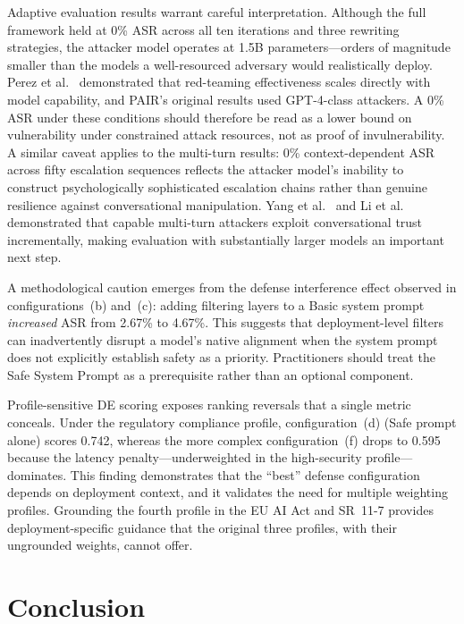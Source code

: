 Adaptive evaluation results warrant careful interpretation. Although the full framework held at 0\% ASR across all ten iterations and three rewriting strategies, the attacker model operates at 1.5B parameters---orders of magnitude smaller than the models a well-resourced adversary would realistically deploy. Perez et al.\ \cite{perez2022red} demonstrated that red-teaming effectiveness scales directly with model capability, and PAIR's original results used GPT-4-class attackers. A 0\% ASR under these conditions should therefore be read as a lower bound on vulnerability under constrained attack resources, not as proof of invulnerability. A similar caveat applies to the multi-turn results: 0\% context-dependent ASR across fifty escalation sequences reflects the attacker model's inability to construct psychologically sophisticated escalation chains rather than genuine resilience against conversational manipulation. Yang et al.\ \cite{yang2024multiturn} and Li et al.\ \cite{li2025fitd} demonstrated that capable multi-turn attackers exploit conversational trust incrementally, making evaluation with substantially larger models an important next step.

A methodological caution emerges from the defense interference effect observed in configurations~(b) and~(c): adding filtering layers to a Basic system prompt \emph{increased} ASR from 2.67\% to 4.67\%. This suggests that deployment-level filters can inadvertently disrupt a model's native alignment when the system prompt does not explicitly establish safety as a priority. Practitioners should treat the Safe System Prompt as a prerequisite rather than an optional component.

Profile-sensitive DE scoring exposes ranking reversals that a single metric conceals. Under the regulatory compliance profile, configuration~(d) (Safe prompt alone) scores 0.742, whereas the more complex configuration~(f) drops to 0.595 because the latency penalty---underweighted in the high-security profile---dominates. This finding demonstrates that the ``best'' defense configuration depends on deployment context, and it validates the need for multiple weighting profiles. Grounding the fourth profile in the EU AI Act \cite{euaiact2024} and SR~11-7 \cite{federalreserve2011sr} provides deployment-specific guidance that the original three profiles, with their ungrounded weights, cannot offer.

\section{Conclusion}

